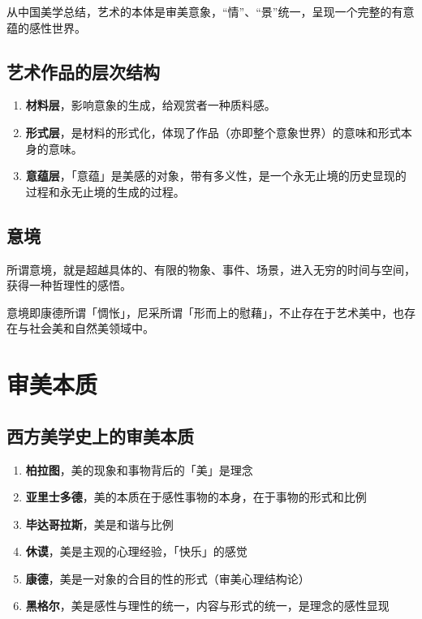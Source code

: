 \documentclass{NoteThesis/note-thesis}
\begin{document}
从中国美学总结，艺术的本体是审美意象，“情”、“景”统一，呈现一个完整的有意蕴的感性世界。

\subsection{艺术作品的层次结构}

\begin{enumerate}
    \item \textbf{材料层}，影响意象的生成，给观赏者一种质料感。
    \item \textbf{形式层}，是材料的形式化，体现了作品（亦即整个意象世界）的意味和形式本身的意味。
    \item \textbf{意蕴层}，「意蕴」是美感的对象，带有多义性，是一个永无止境的历史显现的过程和永无止境的生成的过程。
\end{enumerate}

\subsection{意境}

所谓意境，就是超越具体的、有限的物象、事件、场景，进入无穷的时间与空间，获得一种哲理性的感悟。

意境即康德所谓「惆怅」，尼采所谓「形而上的慰藉」，不止存在于艺术美中，也存在与社会美和自然美领域中。

\section{\texorpdfstring{\mbox{}}{} 审美本质}

\subsection{西方美学史上的审美本质}

\begin{enumerate}
    \item \textbf{柏拉图}，美的现象和事物背后的「美」是理念
    \item \textbf{亚里士多德}，美的本质在于感性事物的本身，在于事物的形式和比例
    \item \textbf{毕达哥拉斯}，美是和谐与比例
    \item \textbf{休谟}，美是主观的心理经验，「快乐」的感觉
    \item \textbf{康德}，美是一对象的合目的性的形式（审美心理结构论）
    \item \textbf{黑格尔}，美是感性与理性的统一，内容与形式的统一，是理念的感性显现
\end{enumerate}
\end{document}
